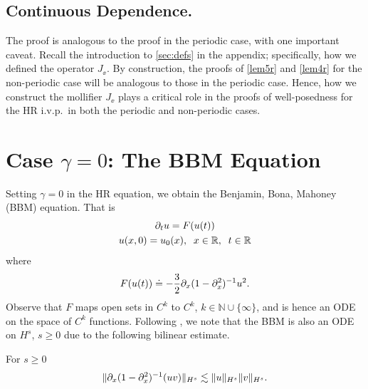\subsection{Continuous Dependence.} The proof is analogous to the proof in
the periodic case, with one important caveat. Recall the introduction to \cref{sec:defs} in the appendix; specifically, how we defined the operator
$J_\ee$. By construction, the proofs of \cref{lem5r} and \cref{lem4r} for the non-periodic case will be
analogous to those in the periodic case. Hence, how we
construct the mollifier $J_\ee$ plays a critical role in the proofs of
well-posedness for the HR i.v.p.\ in both the periodic and non-periodic cases. %
%
%
%
%
%
%
%
\section{Case $\gamma = 0$: The BBM Equation} 
\label{sec:}
Setting $\gamma = 0$ in the HR equation, we obtain the Benjamin, Bona,
Mahoney (BBM) equation. That is
%
%
\begin{gather*}
    \partial_{t} u = F(u(t))
    \\
     u(x,0) = u_0(x), \; \; x \in \mathbb{R}, \; \; t \in \mathbb{R}
\end{gather*}
where
%
%
\begin{equation*}
\begin{split}
    F(u(t)) \doteq -\frac{3}{2} \partial_{x}(1 - \partial_{x}^{2})^{-1} u^{2}.
\end{split}
\end{equation*}
%
Observe that $F$ maps open sets in $C^{k}$ to $C^{k}$,  $k \in \mathbb N \cup
\{\infty \}$, and is hence an ODE on the space of $C^{k}$ functions. Following
\cite{Bona_2009_Sharp-well-pose}, we note that the BBM is also an ODE on
$H^{s}$, $s \ge 0$ due to the following bilinear estimate.
%
%
%
%
%
%
%
%
\begin{lemma}
For $s \ge 0$
%
%
\begin{equation*}
\begin{split}
    \| \partial_{x}(1 - \partial_{x}^{2})^{-1} (uv) \|_{H^{s}} \lesssim \| u \|_{H^{s}} \| v \|_{H^{s}}.
\end{split}
\end{equation*}
%
%
\label{lem:bbm-bilin-est}
\end{lemma}
%
%
%
